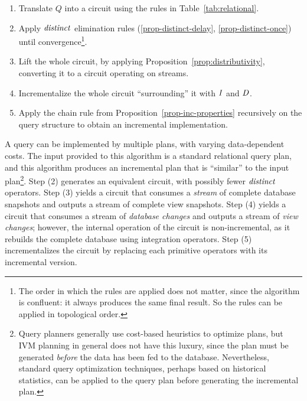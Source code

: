 \begin{algorithm}\label{algorithm-inc}\quad
\begin{enumerate}[nosep, leftmargin=\parindent]
    \item Translate $Q$ into a circuit using the rules in Table~\ref{tab:relational}.
    \item Apply $\mathit{distinct}$ elimination rules (\ref{prop-distinct-delay}, \ref{prop-distinct-once}) until convergence\footnote{The 
    order in which the rules are applied does not matter, since the algorithm is 
    confluent: it always produces the same final result. So the rules can be applied in topological order.}.
    \item Lift the whole circuit, by applying Proposition~\ref{prop:distributivity},
    converting it to a circuit operating on streams.
    \item Incrementalize the whole circuit ``surrounding'' it with $\mathit{I}$ and $\mathit{D}$.
    \item Apply the chain rule 
    from Proposition~\ref{prop-inc-properties} recursively on the query structure
    to obtain an incremental implementation.  
\end{enumerate}
\end{algorithm}

A query can be implemented by multiple plans, with varying data-dependent costs.  The input provided
to this algorithm is a standard relational query plan, and this algorithm produces
an incremental plan that is ``similar'' to the input plan\footnote{Query planners generally use cost-based 
heuristics to optimize plans, but IVM planning in general does not have this luxury, since the plan
must be generated \emph{before} the data has been fed to the database.  Nevertheless, standard query 
optimization techniques, perhaps based on historical statistics, can be applied to the query plan before 
generating the incremental plan.}.  Step (2) generates an equivalent circuit, with possibly 
fewer $\mathit{distinct}$ operators.
Step (3) yields a circuit that consumes a \emph{stream} of complete database snapshots and outputs a 
stream of complete view snapshots. Step (4) yields a circuit that consumes a stream of \emph{database changes}
and outputs a stream of \emph{view changes}; however, the internal operation of the 
circuit is non-incremental, as it rebuilds the complete database using
integration operators.  Step (5) incrementalizes the circuit by replacing each  
primitive operators with its incremental version.

